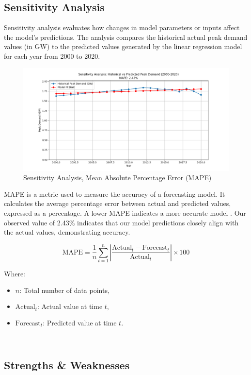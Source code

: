 \documentclass[12pt]{article}
\begin{document}
\subsection{Sensitivity Analysis}
Sensitivity analysis evaluates how changes in model parameters or inputs affect the model's predictions. The analysis compares the historical actual peak demand values (in GW) to the predicted values generated by the linear regression model for each year from 2000 to 2020.


\begin{figure}[H]
  \centering
  \includegraphics[scale=.5]{Sensistivity Analysis .png}
  \caption{Sensitivity Analysis, Mean Absolute Percentage Error (MAPE)}
  \label{fig:methodology}
\end{figure}

MAPE is a metric used to measure the accuracy of a forecasting model. It calculates the average percentage error between actual and predicted values, expressed as a percentage. A lower MAPE indicates a more accurate model \cite{Hyndman2008}. Our observed value of 2.43\% indicates that our model predictions closely align with the actual values, demonstrating accuracy.

\[
\text{MAPE} = \frac{1}{n} \sum_{t=1}^{n} \left| \frac{\text{Actual}_t - \text{Forecast}_t}{\text{Actual}_t} \right| \times 100
\]

Where:
\begin{itemize}
    \item $n$: Total number of data points,
    \item $\text{Actual}_t$: Actual value at time $t$,
    \item $\text{Forecast}_t$: Predicted value at time $t$.
\end{itemize}\\

\subsection{Strengths \& Weaknesses}
\end{document}
